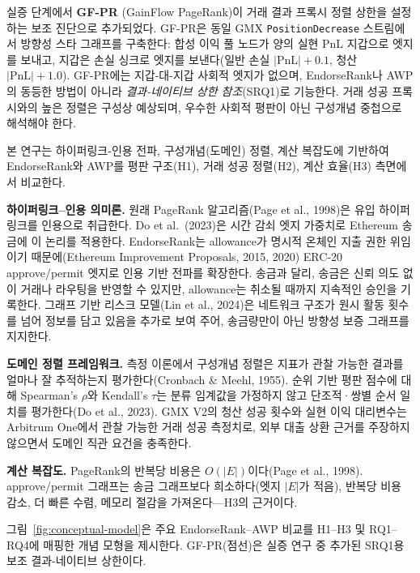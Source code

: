
실증 단계에서 \textbf{GF-PR} (GainFlow PageRank)이 거래 결과 프록시 정렬 상한을 설정하는 보조 진단으로 추가되었다. GF-PR은 동일 GMX \texttt{PositionDecrease} 스트림에서 방향성 스타 그래프를 구축한다: 합성 이익 풀 노드가 양의 실현 PnL 지갑으로 엣지를 보내고, 지갑은 손실 싱크로 엣지를 보낸다(일반 손실 $|\text{PnL}|+0.1$, 청산 $|\text{PnL}|+1.0$). GF-PR에는 지갑-대-지갑 사회적 엣지가 없으며, EndorseRank나 AWP의 동등한 방법이 아니라 \emph{결과-네이티브 상한 참조}(SRQ1)로 기능한다. 거래 성공 프록시와의 높은 정렬은 구성상 예상되며, 우수한 사회적 평판이 아닌 구성개념 중첩으로 해석해야 한다.


본 연구는 하이퍼링크-인용 전파, 구성개념(도메인) 정렬, 계산 복잡도에 기반하여 EndorseRank와 AWP를 평판 구조(H1), 거래 성공 정렬(H2), 계산 효율(H3) 측면에서 비교한다.

\textbf{하이퍼링크--인용 의미론.} 원래 PageRank 알고리즘(Page et al., 1998)은 유입 하이퍼링크를 인용으로 취급한다. Do et al.\ (2023)은 시간 감쇠 엣지 가중치로 Ethereum 송금에 이 논리를 적용한다. EndorseRank는 allowance가 명시적 온체인 지출 권한 위임이기 때문에(Ethereum Improvement Proposals, 2015, 2020) ERC-20 approve/permit 엣지로 인용 기반 전파를 확장한다. 송금과 달리, 송금은 신뢰 의도 없이 거래나 라우팅을 반영할 수 있지만, allowance는 취소될 때까지 지속적인 승인을 기록한다. 그래프 기반 리스크 모델(Lin et al., 2024)은 네트워크 구조가 원시 활동 횟수를 넘어 정보를 담고 있음을 추가로 보여 주어, 송금량만이 아닌 방향성 보증 그래프를 지지한다.

\textbf{도메인 정렬 프레임워크.} 측정 이론에서 구성개념 정렬은 지표가 관찰 가능한 결과를 얼마나 잘 추적하는지 평가한다(Cronbach \& Meehl, 1955). 순위 기반 평판 점수에 대해 Spearman's $\rho$와 Kendall's $\tau$는 분류 임계값을 가정하지 않고 단조적·쌍별 순서 일치를 평가한다(Do et al., 2023). GMX V2의 청산 성공 횟수와 실현 이익 대리변수는 Arbitrum One에서 관찰 가능한 거래 성공 측정치로, 외부 대출 상환 근거를 주장하지 않으면서 도메인 직관 요건을 충족한다.

\textbf{계산 복잡도.} PageRank의 반복당 비용은 $O(|E|)$이다(Page et al., 1998). approve/permit 그래프는 송금 그래프보다 희소하다(엣지 $|E|$가 적음), 반복당 비용 감소, 더 빠른 수렴, 메모리 절감을 가져온다---H3의 근거이다.

그림~\ref{fig:conceptual-model}은 주요 EndorseRank--AWP 비교를 H1--H3 및 RQ1--RQ4에 매핑한 개념 모형을 제시한다. GF-PR(점선)은 실증 연구 중 추가된 SRQ1용 보조 결과-네이티브 상한이다.

